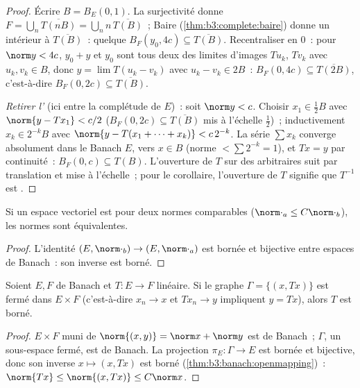 \begin{proof}
Écrire $B = B_E(0,1)$. La surjectivité donne $F = \bigcup_n
\overline{T(nB)} = \bigcup_n n\,\overline{T(B)}$~; Baire
(\cref{thm:b3:complete:baire}) donne un intérieur à
$\overline{T(B)}$~: quelque $B_F(y_0, 4c) \subseteq
\overline{T(B)}$. Recentraliser en $0$~: pour $\norm y < 4c$,
$y_0 + y$ et $y_0$ sont tous deux des limites d'images $Tu_k$,
$Tv_k$ avec $u_k, v_k \in B$, donc $y = \lim T(u_k - v_k)$
avec $u_k - v_k \in 2B$~: $B_F(0, 4c) \subseteq
\overline{T(2B)}$, c'est-à-dire $B_F(0, 2c) \subseteq
\overline{T(B)}$.

\emph{Retirer l'} (ici entre la complétude de $E$)~:
soit $\norm y < c$. Choisir $x_1 \in \frac12 B$ avec $\norm{y
- Tx_1} < c/2$ ($B_F(0,2c) \subseteq \overline{T(B)}$ mis à
l'échelle $\frac12$)~; inductivement $x_k \in 2^{-k}B$ avec
$\norm{y - T(x_1 + \dots + x_k)} < c\,2^{-k}$. La série
$\sum x_k$ converge absolument dans le Banach $E$, vers $x \in
B$ (norme $< \sum 2^{-k} = 1$), et $Tx = y$ par continuité~:
$B_F(0, c) \subseteq T(B)$. L'ouverture de $T$ sur des
 arbitraires suit par translation et mise à l'échelle~;
pour le corollaire, l'ouverture de $T$ signifie que $T^{-1}$
est .
\end{proof}

\begin{corollary}\label{cor:b3:banach:equivnorms}
Si un espace vectoriel est  pour deux normes
comparables ($\norm\cdot_a \leq C\norm\cdot_b$), les normes
sont équivalentes.
\end{corollary}

\begin{proof}
L'identité $(E, \norm\cdot_b) \to (E, \norm\cdot_a)$ est
bornée et bijective entre espaces de Banach~: son inverse est
borné.
\end{proof}

\begin{theorem}\label{thm:b3:banach:closedgraph}
Soient $E, F$ de Banach et $T \colon E \to F$ linéaire. Si le
graphe $\Gamma = \{(x, Tx)\}$ est fermé dans $E \times F$
(c'est-à-dire $x_n \to x$ et $Tx_n \to y$ impliquent $y =
Tx$), alors $T$ est borné.
\end{theorem}

\begin{proof}
$E \times F$ muni de $\norm{(x,y)} = \norm x + \norm y$ est
de Banach~; $\Gamma$, un sous-espace fermé, est de Banach. La
projection $\pi_E\colon \Gamma \to E$ est bornée et bijective,
donc son inverse $x \mapsto (x, Tx)$ est borné
(\cref{thm:b3:banach:openmapping})~: $\norm{Tx} \leq
\norm{(x, Tx)} \leq C\norm x$.
\end{proof}

